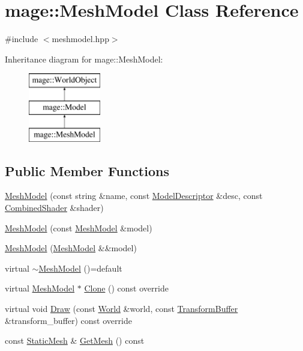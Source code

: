 \hypertarget{classmage_1_1_mesh_model}{}\section{mage\+:\+:Mesh\+Model Class Reference}
\label{classmage_1_1_mesh_model}


{\ttfamily \#include $<$meshmodel.\+hpp$>$}

Inheritance diagram for mage\+:\+:Mesh\+Model\+:\begin{figure}[H]
\begin{center}
\leavevmode
\includegraphics[height=3.000000cm]{classmage_1_1_mesh_model}
\end{center}
\end{figure}
\subsection*{Public Member Functions}
\begin{DoxyCompactItemize}
\item 
\hyperlink{classmage_1_1_mesh_model_a95d70993b56b1a649797880583daf3db}{Mesh\+Model} (const string \&name, const \hyperlink{classmage_1_1_model_descriptor}{Model\+Descriptor} \&desc, const \hyperlink{structmage_1_1_combined_shader}{Combined\+Shader} \&shader)
\item 
\hyperlink{classmage_1_1_mesh_model_a74d2443e5d4b0f66ef981ad1312e4987}{Mesh\+Model} (const \hyperlink{classmage_1_1_mesh_model}{Mesh\+Model} \&model)
\item 
\hyperlink{classmage_1_1_mesh_model_afd5dc4033fe3d1277e4d2756b0de2c04}{Mesh\+Model} (\hyperlink{classmage_1_1_mesh_model}{Mesh\+Model} \&\&model)
\item 
virtual \hyperlink{classmage_1_1_mesh_model_a5e918737b966842a31381ef6c00ca6d2}{$\sim$\+Mesh\+Model} ()=default
\item 
virtual \hyperlink{classmage_1_1_mesh_model}{Mesh\+Model} $\ast$ \hyperlink{classmage_1_1_mesh_model_a7130eca9a1dac038c33b838c15138161}{Clone} () const override
\item 
virtual void \hyperlink{classmage_1_1_mesh_model_a3e0f9f6d78e00f264d4611f809961c8a}{Draw} (const \hyperlink{classmage_1_1_world}{World} \&world, const \hyperlink{structmage_1_1_transform_buffer}{Transform\+Buffer} \&transform\+\_\+buffer) const override
\item 
const \hyperlink{classmage_1_1_static_mesh}{Static\+Mesh} \& \hyperlink{classmage_1_1_mesh_model_ab7785be4bca18d9f9ef2f42ce3b727db}{Get\+Mesh} () const
\end{DoxyCompactItemize}
